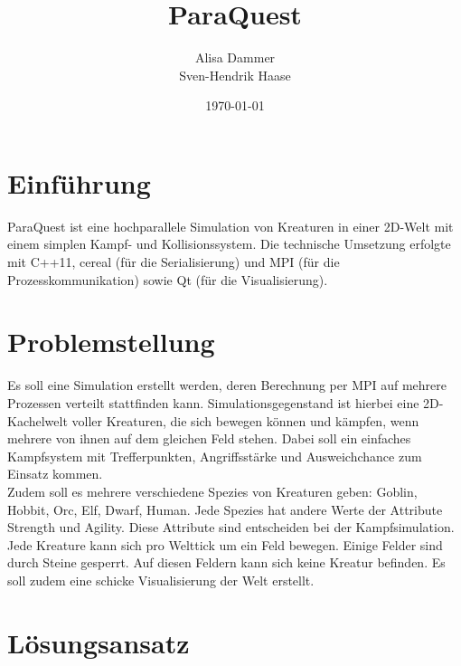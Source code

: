 \documentclass[a4paper,12pt]{article}
\begin{document}
\renewcommand\bibname{Referenzen}
\renewcommand\refname{Referenzen}

\begin{titlepage}
    \author{Alisa Dammer\\
    Sven-Hendrik Haase}
    \title{ParaQuest}
    \date{\today} 
    \maketitle
    \thispagestyle{empty}
\end{titlepage}

\tableofcontents

\newpage

\section{Einführung}
ParaQuest ist eine hochparallele Simulation von Kreaturen in einer 2D-Welt
mit einem simplen Kampf- und Kollisionssystem. Die technische Umsetzung
erfolgte mit C++11, cereal (für die Serialisierung) und MPI (für die Prozesskommunikation) sowie Qt (für die Visualisierung).

\section{Problemstellung}
Es soll eine Simulation erstellt werden, deren Berechnung per MPI auf
mehrere Prozessen verteilt stattfinden kann. Simulationsgegenstand ist hierbei
eine 2D-Kachelwelt voller Kreaturen, die sich bewegen können und kämpfen,
wenn mehrere von ihnen auf dem gleichen Feld stehen. Dabei soll ein einfaches
Kampfsystem mit Trefferpunkten, Angriffsstärke und Ausweichchance zum Einsatz
kommen.\\
Zudem soll es mehrere verschiedene Spezies von Kreaturen geben: Goblin, Hobbit, Orc, Elf, Dwarf, Human. Jede Spezies hat andere Werte der Attribute Strength und Agility. Diese Attribute sind entscheiden bei der Kampfsimulation.
Jede Kreature kann sich pro Welttick um ein Feld bewegen. Einige Felder sind
durch Steine gesperrt. Auf diesen Feldern kann sich keine Kreatur befinden.
Es soll zudem eine schicke Visualisierung der Welt erstellt.

\section{Lösungsansatz}
\end{document}
